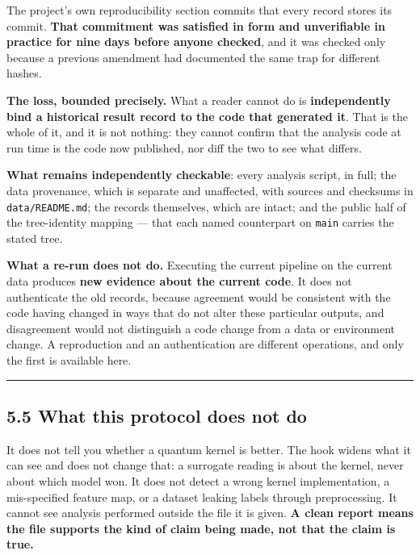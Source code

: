 \documentclass[
  10pt,
]{article}
\begin{document}
The project's own reproducibility section commits that every record
stores its commit. \textbf{That commitment was satisfied in form and
unverifiable in practice for nine days before anyone checked}, and it
was checked only because a previous amendment had documented the same
trap for different hashes.

\textbf{The loss, bounded precisely.} What a reader cannot do is
\textbf{independently bind a historical result record to the code that
generated it}. That is the whole of it, and it is not nothing: they
cannot confirm that the analysis code at run time is the code now
published, nor diff the two to see what differs.

\textbf{What remains independently checkable}: every analysis script, in
full; the data provenance, which is separate and unaffected, with
sources and checksums in \texttt{data/\allowbreak{}README.md}; the records
themselves, which are intact; and the public half of the tree-identity
mapping --- that each named counterpart on \texttt{main} carries the
stated tree.

\textbf{What a re-run does not do.} Executing the current pipeline on
the current data produces \textbf{new evidence about the current code}.
It does not authenticate the old records, because agreement would be
consistent with the code having changed in ways that do not alter these
particular outputs, and disagreement would not distinguish a code change
from a data or environment change. A reproduction and an authentication
are different operations, and only the first is available here.

\begin{center}\rule{0.5\linewidth}{0.5pt}\end{center}

\subsection{5.5 What this protocol does not
do}\label{what-this-protocol-does-not-do}

It does not tell you whether a quantum kernel is better. The hook widens
what it can see and does not change that: a surrogate reading is about
the kernel, never about which model won. It does not detect a wrong
kernel implementation, a mis-specified feature map, or a dataset leaking
labels through preprocessing. It cannot see analysis performed outside
the file it is given. \textbf{A clean report means the file supports the
kind of claim being made, not that the claim is true.}
\end{document}
